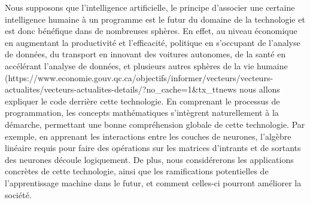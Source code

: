 Nous supposons que l’intelligence artificielle, le principe d’associer une certaine intelligence humaine à un programme est le futur du domaine de la technologie et est donc bénéfique dans de nombreuses sphères. En effet,  au niveau économique en augmentant la productivité et l’efficacité, politique en s’occupant de l’analyse de données, du transport en innovant des voitures autonomes, de la santé en accélérant l’analyse de données, et plusieurs autres sphères de la vie humaine (https://www.economie.gouv.qc.ca/objectifs/informer/vecteurs/vecteurs-actualites/vecteurs-actualites-details/?no_cache=1&tx_ttnews%
nous allons expliquer le code derrière cette technologie. En comprenant le processus de programmation, les concepts mathématiques s'intègrent naturellement à la démarche, permettant une bonne compréhension globale de cette technologie. Par exemple, en apprenant les interactions entre les couches de neurones, l'algèbre linéaire requis pour faire des opérations sur les matrices d'intrants et de sortants des neurones découle logiquement. De plus, nous considérerons les applications concrètes de cette technologie, ainsi que les ramifications potentielles de l'apprentissage machine dans le futur, et comment celles-ci pourront améliorer la société.

